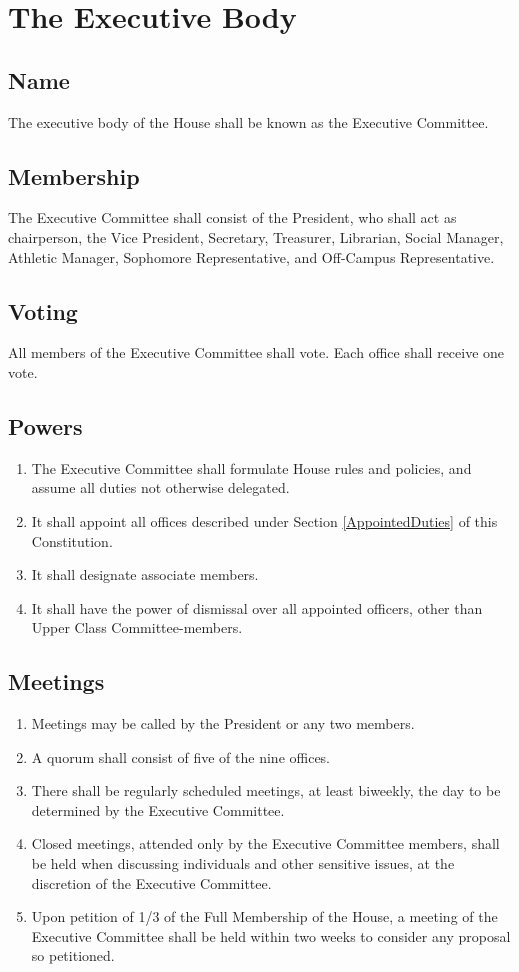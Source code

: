 \documentclass[10pt]{article} %
\begin{document}
\section{The Executive Body}
\subsection{Name}
The executive body of the House shall be known as the Executive Committee.
\subsection{Membership}
The Executive Committee shall consist of the President, who shall act as chairperson, the Vice President, Secretary, Treasurer, Librarian, Social Manager, Athletic Manager, Sophomore Representative, and Off-Campus Representative.
\subsection{Voting}
All members of the Executive Committee shall vote. Each office shall receive one vote.
\subsection{Powers}
\begin{enumerate}
\item The Executive Committee shall formulate House rules and policies, and assume all duties not otherwise delegated.
\item It shall appoint all offices described under Section \ref{AppointedDuties} of this Constitution.
\item It shall designate associate members.
\item It shall have the power of dismissal over all appointed officers, other than Upper Class Committee-members.
\end{enumerate}
\subsection{Meetings}
\begin{enumerate}
\item Meetings may be called by the President or any two members.
\item A quorum shall consist of five of the nine offices.
\item There shall be regularly scheduled meetings, at least biweekly, the day to be determined by the Executive Committee.
\item Closed meetings, attended only by the Executive Committee members, shall be held when discussing individuals and other sensitive issues, at the discretion of the Executive Committee.
\item Upon petition of 1/3 of the Full Membership of the House, a meeting of the Executive Committee shall be held within two weeks to consider any proposal so petitioned.
\end{enumerate}
\end{document}
